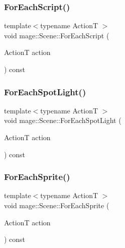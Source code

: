 \hypertarget{classmage_1_1_scene_a4d16d973adce12868b9a0df9d92ef6d6}{}\label{classmage_1_1_scene_a4d16d973adce12868b9a0df9d92ef6d6} 
\subsubsection{\texorpdfstring{For\+Each\+Script()}{ForEachScript()}}
{\footnotesize\ttfamily template$<$typename ActionT $>$ \\
void mage\+::\+Scene\+::\+For\+Each\+Script (\begin{DoxyParamCaption}\item[{ActionT}]{action }\end{DoxyParamCaption}) const}

\hypertarget{classmage_1_1_scene_a51bb697a9d96891bb7502317efff7ec1}{}\label{classmage_1_1_scene_a51bb697a9d96891bb7502317efff7ec1} 
\subsubsection{\texorpdfstring{For\+Each\+Spot\+Light()}{ForEachSpotLight()}}
{\footnotesize\ttfamily template$<$typename ActionT $>$ \\
void mage\+::\+Scene\+::\+For\+Each\+Spot\+Light (\begin{DoxyParamCaption}\item[{ActionT}]{action }\end{DoxyParamCaption}) const}

\hypertarget{classmage_1_1_scene_ae181b160f9a75593db9f551c9c233329}{}\label{classmage_1_1_scene_ae181b160f9a75593db9f551c9c233329} 
\subsubsection{\texorpdfstring{For\+Each\+Sprite()}{ForEachSprite()}}
{\footnotesize\ttfamily template$<$typename ActionT $>$ \\
void mage\+::\+Scene\+::\+For\+Each\+Sprite (\begin{DoxyParamCaption}\item[{ActionT}]{action }\end{DoxyParamCaption}) const}

